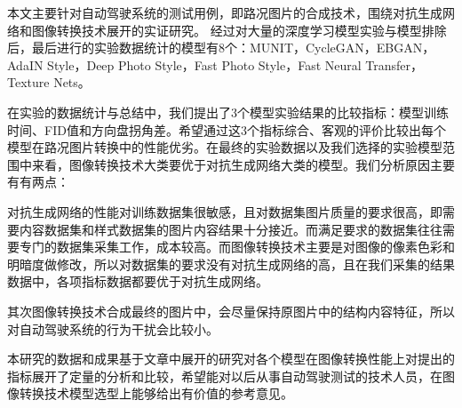 \begin{conclusions}

本文主要针对自动驾驶系统的测试用例，即路况图片的合成技术，围绕对抗生成网络和图像转换技术展开的实证研究。
经过对大量的深度学习模型实验与模型排除后，最后进行的实验数据统计的模型有8个：MUNIT，CycleGAN，EBGAN，AdaIN Style，Deep Photo Style，Fast Photo Style，Fast Neural Transfer，Texture Nets。

在实验的数据统计与总结中，我们提出了3个模型实验结果的比较指标：模型训练时间、FID值和方向盘拐角差。希望通过这3个指标综合、客观的评价比较出每个模型在路况图片转换中的性能优劣。在最终的实验数据以及我们选择的实验模型范围中来看，图像转换技术大类要优于对抗生成网络大类的模型。我们分析原因主要有有两点：

对抗生成网络的性能对训练数据集很敏感，且对数据集图片质量的要求很高，即需要内容数据集和样式数据集的图片内容结果十分接近。而满足要求的数据集往往需要专门的数据集采集工作，成本较高。而图像转换技术主要是对图像的像素色彩和明暗度做修改，所以对数据集的要求没有对抗生成网络的高，且在我们采集的结果数据中，各项指标数据都要优于对抗生成网络。

其次图像转换技术合成最终的图片中，会尽量保持原图片中的结构内容特征，所以对自动驾驶系统的行为干扰会比较小。

本研究的数据和成果基于文章中展开的研究对各个模型在图像转换性能上对提出的指标展开了定量的分析和比较，希望能对以后从事自动驾驶测试的技术人员，在图像转换技术模型选型上能够给出有价值的参考意见。

\end{conclusions}
